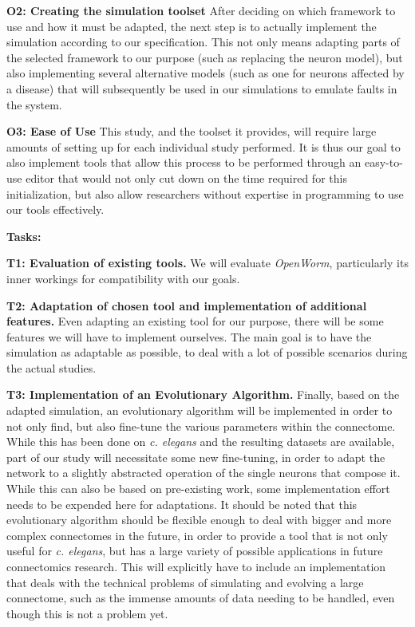 \documentclass[a4paper,11pt]{article}
\begin{document}
\textbf{O2: Creating the simulation toolset}
After deciding on which framework to use and how it must be adapted, the next step is to actually implement the simulation according to our specification. This not only means adapting parts of the selected framework to our purpose (such as replacing the neuron model), but also implementing several alternative models (such as one for neurons affected by a disease) that will subsequently be used in our simulations to emulate faults in the system.

\textbf{O3: Ease of Use}
This study, and the toolset it provides, will require large amounts of setting up for each individual study performed. It is thus our goal to also implement tools that allow this process to be performed through an easy-to-use editor that would not only cut down on the time required for this initialization, but also allow researchers without expertise in programming to use our tools effectively.

\textbf{Tasks:}

\textbf{T1: Evaluation of existing tools.}
We will evaluate \emph{OpenWorm}, particularly its inner workings for compatibility with our goals.

\textbf{T2: Adaptation of chosen tool and implementation of additional features.}
Even adapting an existing tool for our purpose, there will be some features we will have to implement ourselves. The main goal is to have the simulation as adaptable as possible, to deal with a lot of possible scenarios during the actual studies. 

\textbf{T3: Implementation of an Evolutionary Algorithm.}
Finally, based on the adapted simulation, an evolutionary algorithm will be implemented in order to not only find, but also fine-tune the various parameters within the connectome. While this has been done on \emph{c. elegans} and the resulting datasets are available, part of our study will necessitate some new fine-tuning, in order to adapt the network to a slightly abstracted operation of the single neurons that compose it. While this can also be based on pre-existing work, some implementation effort needs to be expended here for adaptations.
It should be noted that this evolutionary algorithm should be flexible enough to deal with bigger and more complex connectomes in the future, in order to provide a tool that is not only useful for \emph{c. elegans}, but has a large variety of possible applications in future connectomics research. This will explicitly have to include an implementation that deals with the technical problems of simulating and evolving a large connectome, such as the immense amounts of data needing to be handled, even though this is not a problem yet.
\end{document}
